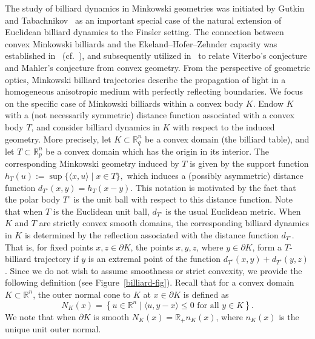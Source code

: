 \documentclass[10pt,a4paper]{article}
\theoremstyle{definition}
\newcommand{\R}{{\mathbb{R}}}
\begin{document}
\medskip

The study of billiard dynamics in Minkowski geometries was initiated by Gutkin and Tabachnikov~\cite{GutTab} as an important special case of the natural extension of Euclidean billiard dynamics to the
Finsler setting. The connection between convex Minkowski billiards and the Ekeland–Hofer–Zehnder capacity was established in~\cite{AA-O} (cf.~\cite{Mink-Bill-Rudolf, R-K, viterbo2000}), and subsequently utilized in~\cite{capacity_mahler} to relate Viterbo's conjecture and Mahler's conjecture from convex geometry.  From the perspective of geometric optics, Minkowski billiard trajectories describe the propagation of light in a homogeneous anisotropic medium with perfectly reflecting boundaries. 
We focus on the specific case of Minkowski billiards within a convex body $K$.
Endow \( K \) with a (not necessarily symmetric) distance function 
associated with a convex body $T$, and consider billiard dynamics in \( K \) with respect to the induced geometry. 
More precisely, let \( K \subset \mathbb{R}^{n}_q \) be a convex domain (the billiard table), and let 
 \( T \subset \mathbb{R}^{n}_p \) be a convex domain which has the origin in its interior. The corresponding Minkowski geometry induced by $T$ is given by the support function 
$
h_T(u) := \sup \{ \langle x, u \rangle \mid x \in T\},
$ which induces a (possibly asymmetric) distance function 
$d_{T^\circ}(x,y) = h_T(x-y)$. 
This notation is motivated by the fact that the polar body $T^\circ$ is the unit ball with respect to this distance function.
Note that when $T$ is the Euclidean unit ball, $d_{T^\circ}$ is the usual Euclidean metric. When \( K \) and \( T \) are strictly convex smooth domains, the corresponding billiard dynamics in \( K \) is determined by the reflection associated with the distance function \( d_{T^\circ} \). That is, for fixed points \( x, z \in \partial K \), the points \( x, y, z \), where \( y \in \partial K \), form a \( T \)-billiard trajectory if \( y \) is an extremal point of the function \( d_{T^\circ}(x,y) + d_{T^\circ}(y,z) \). Since we do not wish to assume smoothness or strict convexity, we provide the following definition (see Figure~\ref{billiard-fig}). Recall that for a convex domain \( K \subset \mathbb{R}^{n} \), 
the outer normal cone to \( K \) at \( x \in \partial K \) is defined as
\[
N_K(x) = \left\{ u \in \mathbb{R}^n \mid \langle u, y - x \rangle \leq 0 \text{ for all } y \in K \right\}. 
\]
We note that when $\partial K$ is smooth $N_K(x) = \R_+ n_K(x)$, where $n_K(x)$ is the unique unit outer normal.
\end{document}
